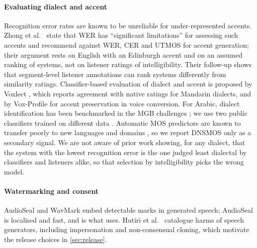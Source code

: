 \paragraph{Evaluating dialect and accent}
Recognition error rates are known to be unreliable for under-represented accents. Zhong et al.\ \citep{zhong2025accent}
state that WER has ``significant limitations'' for assessing such accents and recommend against WER, CER and UTMOS
for accent generation; their argument rests on English with an Edinburgh accent and on an assumed ranking of systems,
not on listener ratings of intelligibility. Their follow-up \citep{zhong2026segmental} shows that segment-level
listener annotations can rank systems differently from similarity ratings. Classifier-based evaluation of dialect
and accent is proposed by Voxlect \citep{feng2025voxlect}, which reports agreement with native ratings for
Mandarin dialects, and by Vox-Profile \citep{feng2025voxprofile} for accent preservation in voice conversion. For
Arabic, dialect identification has been benchmarked in the MGB challenges \citep{ali2017mgb3,ali2019mgb5}; we use
two public classifiers trained on different data \citep{abdullah2025tamyizcard,abdullah2025adivc,
ibrahimamin2025hubertadi}. Automatic MOS predictors are known to transfer poorly to new languages and domains
\citep{huang2022voicemos,cooper2023voicemos,kunesova2024zeroshotmos}, so we report DNSMOS \citep{reddy2021dnsmos,
reddy2022dnsmosp835} only as a secondary signal. We are not aware of prior work showing, for any dialect, that the
system with the lowest recognition error is the one judged least dialectal by classifiers and listeners alike, so
that selection by intelligibility picks the wrong model.

\paragraph{Watermarking and consent}
AudioSeal \citep{sanroman2024audioseal} and WavMark \citep{chen2023wavmark} embed detectable marks in generated
speech; AudioSeal is localised and fast, and is what \BA uses. Hutiri et al.\ \citep{hutiri2024notmyvoice} catalogue
harms of speech generators, including impersonation and non-consensual cloning, which motivate the release choices in
\cref{sec:release}.

